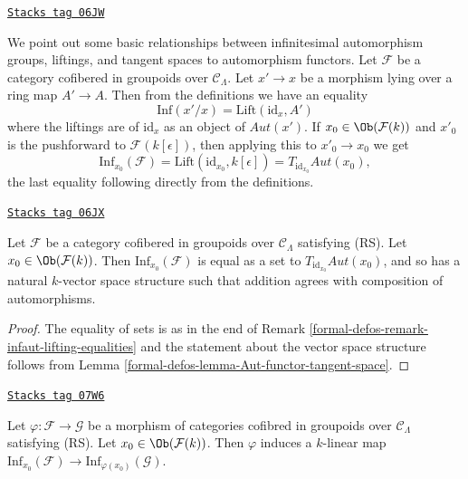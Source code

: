 \begin{remark}
\label{formal-defos-remark-infaut-lifting-equalities}
\href{https://stacks.math.columbia.edu/tag/06JW}{\texttt{Stacks tag 06JW}}

We point out some basic relationships between infinitesimal automorphism
groups, liftings, and tangent spaces to automorphism functors. Let
$\mathcal{F}$ be a category cofibered in groupoids over $\mathcal{C}_\Lambda$.
Let $x' \to x$ be a morphism lying over a ring map $A' \to A$.
Then from the definitions we have an equality
$$
\text{Inf}(x'/x) = \text{Lift}(\text{id}_x, A')
$$
where the liftings are of $\text{id}_x$ as an object of
$\mathit{Aut}(x')$.  If $x_0 \in \Ob(\mathcal{F}(k))$ and $x'_0$
is the pushforward to $\mathcal{F}(k[\epsilon])$, then applying this to
$x'_0 \to x_0$ we get
$$
\text{Inf}_{x_0}(\mathcal{F}) =
\text{Lift}(\text{id}_{x_0}, k[\epsilon]) =
T_{\text{id}_{x_0}} \mathit{Aut}(x_0),
$$
the last equality following directly from the definitions.
\end{remark}

\begin{lemma}
\label{formal-defos-lemma-infaut-vector-space}
\href{https://stacks.math.columbia.edu/tag/06JX}{\texttt{Stacks tag 06JX}}

Let $\mathcal{F}$ be a category cofibered in groupoids over
$\mathcal{C}_\Lambda$ satisfying (RS). Let $x_0 \in \Ob(\mathcal{F}(k))$.
Then $\text{Inf}_{x_0}(\mathcal{F})$ is equal as a set to
$T_{\text{id}_{x_0}} \mathit{Aut}(x_0)$, and so has a natural $k$-vector
space structure such that addition agrees with composition of automorphisms.
\end{lemma}

\begin{proof}
The equality of sets is as in the end of
Remark \ref{formal-defos-remark-infaut-lifting-equalities}
and the statement about the vector space structure follows from
Lemma \ref{formal-defos-lemma-Aut-functor-tangent-space}.
\end{proof}

\begin{lemma}
\label{formal-defos-lemma-k-linear-infaut}
\href{https://stacks.math.columbia.edu/tag/07W6}{\texttt{Stacks tag 07W6}}

Let $\varphi : \mathcal{F} \to \mathcal{G}$ be a morphism of categories
cofibred in groupoids over $\mathcal{C}_\Lambda$ satisfying (RS).
Let $x_0 \in \Ob(\mathcal{F}(k))$. Then $\varphi$ induces a $k$-linear
map $\text{Inf}_{x_0}(\mathcal{F}) \to \text{Inf}_{\varphi(x_0)}(\mathcal{G})$.
\end{lemma}

